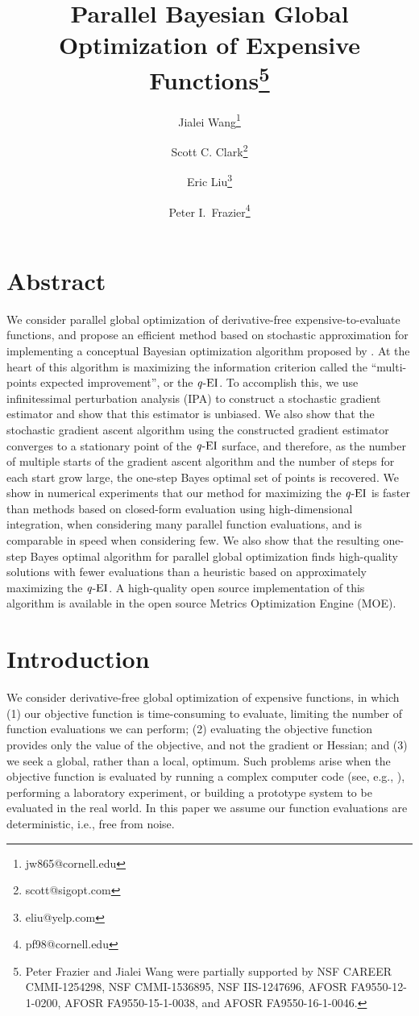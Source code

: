 \documentclass[paper=letter]{scrartcl}
\title{
  Parallel Bayesian Global Optimization of Expensive Functions\thanks{Peter Frazier and Jialei Wang were partially supported by NSF CAREER CMMI-1254298, NSF CMMI-1536895, NSF IIS-1247696, AFOSR FA9550-12-1-0200, AFOSR FA9550-15-1-0038, and AFOSR FA9550-16-1-0046.}
}
\date{}
\author[1]{Jialei Wang\thanks{jw865@cornell.edu}}
\author[2]{Scott C. Clark\thanks{scott@sigopt.com}}
\author[3]{Eric Liu\thanks{eliu@yelp.com}}
\author[1]{Peter I.\ Frazier\thanks{pf98@cornell.edu}}
\affil[1]{School of Operations Research and Information Engineering, Cornell University}
\affil[2]{SigOpt, 244 Kearny St, San Francisco, CA}
\affil[3]{Yelp, Inc., 140 New Montgomery, San Francisco, CA}
\newcommand{\qEI}{\text{\textit q-EI}}
\begin{document}
\maketitle								

\section*{Abstract}
We consider parallel global optimization of derivative-free expensive-to-evaluate functions, and
propose an efficient method based on stochastic approximation for implementing a conceptual Bayesian
optimization algorithm proposed by \cite{GiLeCa08}. At the heart of this algorithm is maximizing 
the information criterion called the ``multi-points expected improvement'', or the $\qEI$.
To accomplish this, we use infinitessimal
perturbation analysis (IPA) to construct a stochastic gradient estimator and show that this estimator
is unbiased. We also show that the stochastic gradient ascent algorithm using the constructed gradient
estimator converges to a stationary point of the $\qEI$ surface, and therefore, as the number of 
multiple starts of the gradient ascent algorithm and the number of steps for each start grow large, 
the one-step Bayes optimal set of points is recovered.
We show in numerical experiments that our method for maximizing the $\qEI$ is faster 
than methods based on closed-form evaluation using high-dimensional integration, when considering many parallel function evaluations, and is comparable in speed when considering few.
We also show that the resulting one-step Bayes optimal algorithm for parallel global optimization finds high-quality solutions with fewer evaluations than a heuristic based on approximately maximizing the $\qEI$.
A high-quality open source implementation of this algorithm is available in the open source Metrics Optimization Engine (MOE). 

\section{Introduction}
\label{sec:intro}
We consider derivative-free global optimization of expensive functions, in which 
(1) our objective function is time-consuming to evaluate, limiting the number of 
function evaluations we can perform; (2) evaluating the objective function provides 
only the value of the objective, and not the gradient or Hessian; and (3) we seek a global, 
rather than a local, optimum.  Such problems arise when the objective 
function is evaluated by running a complex computer code (see, e.g., \citealt{sacks1989design}), 
performing a laboratory experiment, 
or building a prototype system to be evaluated in the real world. 
In this paper we assume our function evaluations are deterministic, i.e., free from noise.
\end{document}

